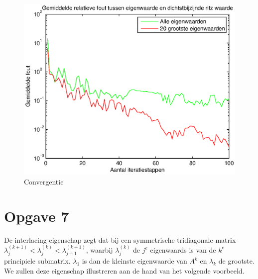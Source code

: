 \documentclass[]{article}
\newcommand{\opgave}[1]{\pagebreak\section*{Opgave #1}}
\begin{document}
\begin{figure}[h]
\noindent \includegraphics[width=1\linewidth]{Opgave6.eps}
\caption{Convergentie}
\label{opgave6}
\end{figure}


\opgave{7}


De interlacing eigenschap zegt dat bij een symmetrische tridiagonale matrix $\lambda ^{(k+1)}_{j} < \lambda ^{(k)}_{j} < \lambda ^{(k+1)}_{j+1}$, waarbij $\lambda ^{(k)}_{j}$ de $j^{e}$ eigenwaards is van de $k^{e}$ principiele submatrix. $\lambda _{1}$ is dan de kleinste eigenwaarde van $A^{k}$ en $\lambda _{k}$ de grootste. We zullen deze eigenschap illustreren aan de hand van het volgende voorbeeld.
\end{document}
